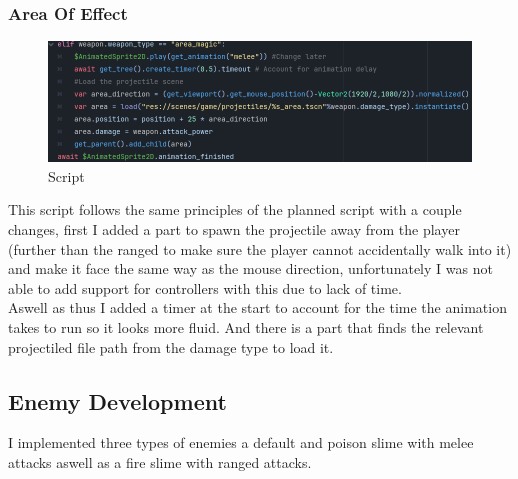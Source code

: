\documentclass{article}
\begin{document}
        \subsubsection{Area Of Effect}
        \begin{figure}[H]
                \centering
                \includegraphics[width = 0.9\columnwidth]{images/development/AreaMagic_attack.PNG}
                \caption{Script}
        \end{figure}
        This script follows the same principles of the planned script with a couple changes, first I added a part to spawn the projectile away from the player (further than the ranged to make sure the player cannot accidentally walk into it) and make it face the same way as the mouse direction, unfortunately I was not able to add support for controllers with this due to lack of time.\\
        Aswell as thus I added a timer at the start to account for the time the animation takes to run so it looks more fluid. And there is a part that finds the relevant projectiled file path from the damage type to load it.\\
        \subsection{Enemy Development}
        I implemented three types of enemies a default and poison slime with melee attacks aswell as a fire slime with ranged attacks.\\
\end{document}
